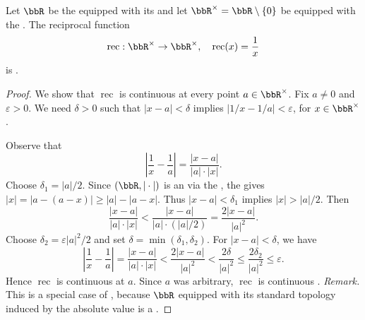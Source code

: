 \begin{proposition} \label{proposition:reciprocal_function_on_real_numbers_is_continuous}
    Let $\bbR$ be the  equipped with its  and let $\bbR^\times = \bbR \setminus \{0\}$ be equipped with the . The reciprocal function
    $$\operatorname{rec} : \bbR^\times \to \bbR^\times, \quad \operatorname{rec}(x) = \frac{1}{x}$$
    is .
\end{proposition}
\begin{proof}
    We show that $\operatorname{rec}$ is continuous at every point $a \in \bbR^\times$. Fix $a \neq 0$ and $\varepsilon > 0$. We need $\delta > 0$ such that $|x - a| < \delta$ implies $|1/x - 1/a| < \varepsilon$, for $x \in \bbR^\times$.

    Observe that
    $$\left|\frac{1}{x} - \frac{1}{a}\right| = \frac{|x - a|}{|a| \cdot |x|}.$$
    Choose $\delta_1 = |a|/2$. Since $(\bbR, |\cdot|)$ is an  via the , the  gives $|x| = |a - (a - x)| \geq |a| - |a - x|$. Thus $|x - a| < \delta_1$ implies $|x| > |a|/2$. Then
    $$\frac{|x - a|}{|a| \cdot |x|} < \frac{|x - a|}{|a| \cdot (|a|/2)} = \frac{2|x - a|}{|a|^2}.$$
    Choose $\delta_2 = \varepsilon |a|^2 / 2$ and set $\delta = \min(\delta_1, \delta_2)$. For $|x - a| < \delta$, we have
    $$\left|\frac{1}{x} - \frac{1}{a}\right| =  \frac{|x - a|}{|a| \cdot |x|} < \frac{2|x-a|}{|a|^2} < \frac{2\delta}{|a|^2} \leq \frac{2 \delta_2}{|a|^2} \leq \varepsilon.$$
    Hence $\operatorname{rec}$ is continuous at $a$. Since $a$ was arbitrary, $\operatorname{rec}$ is continuous .
    \medskip
    \noindent\textit{Remark.} This is a special case of , because $\bbR$ equipped with its standard topology induced by the absolute value is a .
\end{proof}